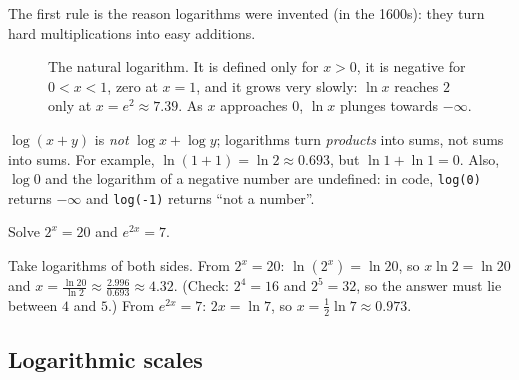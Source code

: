 The first rule is the reason logarithms were invented (in the 1600s): they
turn hard multiplications into easy additions.

\begin{figure}[htbp]
\centering
{}
\caption{The natural logarithm. It is defined only for $x > 0$, it is negative
  for $0 < x < 1$, zero at $x = 1$, and it grows very slowly: $\ln x$ reaches
  $2$ only at $x = e^2 \approx 7.39$. As $x$ approaches $0$, $\ln x$ plunges
  towards $-\infty$.}
\label{fig:ln}
\end{figure}

\begin{pitfall}
$\log(x + y)$ is \emph{not} $\log x + \log y$; logarithms turn
\emph{products} into sums, not sums into sums. For example,
$\ln(1 + 1) = \ln 2 \approx 0.693$, but $\ln 1 + \ln 1 = 0$. Also, $\log 0$ and
the logarithm of a negative number are undefined: in code, \texttt{log(0)}
returns $-\infty$ and \texttt{log(-1)} returns ``not a number''.
\end{pitfall}

\begin{example}
Solve $2^x = 20$ and $e^{2x} = 7$.

\sol Take logarithms of both sides. From $2^x = 20$: $\ln(2^x) = \ln 20$, so
$x\ln 2 = \ln 20$ and $x = \frac{\ln 20}{\ln 2} \approx \frac{2.996}{0.693}
\approx 4.32$. (Check: $2^4 = 16$ and $2^5 = 32$, so the answer must lie between
$4$ and $5$.) From $e^{2x} = 7$: $2x = \ln 7$, so $x = \tfrac12\ln7 \approx
0.973$.
\end{example}

\subsection{Logarithmic scales}

